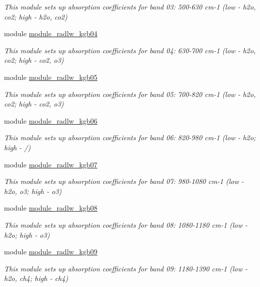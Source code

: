 \begin{DoxyCompactItemize}
\begin{DoxyCompactList}\small\item\em This module sets up absorption coefficients for band 03\+: 500-\/630 cm-\/1 (low -\/ h2o, co2; high -\/ h2o, co2) \end{DoxyCompactList}\item 
module \hyperlink{namespacemodule__radlw__kgb04}{module\+\_\+radlw\+\_\+kgb04}
\begin{DoxyCompactList}\small\item\em This module sets up absorption coefficients for band 04\+: 630-\/700 cm-\/1 (low -\/ h2o, co2; high -\/ co2, o3) \end{DoxyCompactList}\item 
module \hyperlink{namespacemodule__radlw__kgb05}{module\+\_\+radlw\+\_\+kgb05}
\begin{DoxyCompactList}\small\item\em This module sets up absorption coefficients for band 05\+: 700-\/820 cm-\/1 (low -\/ h2o, co2; high -\/ co2, o3) \end{DoxyCompactList}\item 
module \hyperlink{namespacemodule__radlw__kgb06}{module\+\_\+radlw\+\_\+kgb06}
\begin{DoxyCompactList}\small\item\em This module sets up absorption coefficients for band 06\+: 820-\/980 cm-\/1 (low -\/ h2o; high -\/ /) \end{DoxyCompactList}\item 
module \hyperlink{namespacemodule__radlw__kgb07}{module\+\_\+radlw\+\_\+kgb07}
\begin{DoxyCompactList}\small\item\em This module sets up absorption coefficients for band 07\+: 980-\/1080 cm-\/1 (low -\/ h2o, o3; high -\/ o3) \end{DoxyCompactList}\item 
module \hyperlink{namespacemodule__radlw__kgb08}{module\+\_\+radlw\+\_\+kgb08}
\begin{DoxyCompactList}\small\item\em This module sets up absorption coefficients for band 08\+: 1080-\/1180 cm-\/1 (low -\/ h2o; high -\/ o3) \end{DoxyCompactList}\item 
module \hyperlink{namespacemodule__radlw__kgb09}{module\+\_\+radlw\+\_\+kgb09}
\begin{DoxyCompactList}\small\item\em This module sets up absorption coefficients for band 09\+: 1180-\/1390 cm-\/1 (low -\/ h2o, ch4; high -\/ ch4) \end{DoxyCompactList}\item 

\end{DoxyCompactItemize}
